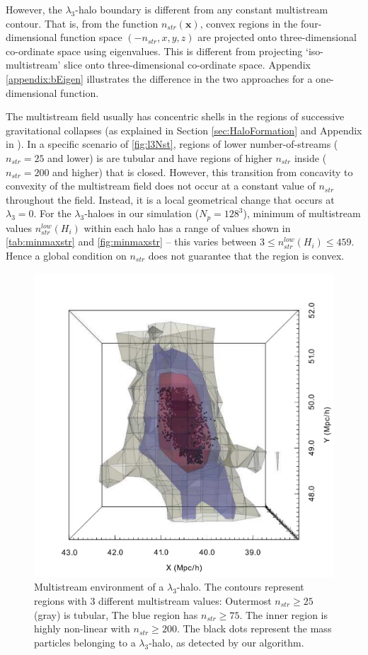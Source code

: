 However, the $\lambda_3$-halo boundary is different from any constant multistream contour. That is, from the function $n_{str}(\mathbf{x})$, convex regions in the four-dimensional function space $(-n_{str}, x, y, z)$ are projected onto three-dimensional co-ordinate space using eigenvalues. This is different from projecting `iso-multistream' slice onto three-dimensional co-ordinate space. Appendix \ref{appendix:bEigen} illustrates the difference in the two approaches for a one-dimensional function. 


The multistream field usually has concentric shells in the regions of successive gravitational collapses (as explained in Section \ref{sec:HaloFormation} and Appendix in \citealt{Ramachandra2017}). In a specific scenario  of \autoref{fig:l3Nst}, regions of lower number-of-streams ($n_{str} = 25$ and lower) is are tubular and have regions of higher $n_{str}$ inside ($n_{str} = 200$ and higher) that is closed. However, this transition from concavity to convexity of the multistream field does not occur at a constant value of $n_{str}$ throughout the field. Instead, it is a local geometrical change that occurs at $\lambda_3 = 0$. For the $\lambda_3$-haloes in our simulation ($N_p = 128^3$), minimum of multistream values $n_{str}^{low}(H_i)$ within each halo has a range of values shown in \autoref{tab:minmaxstr} and \autoref{fig:minmaxstr} -- this varies between $ 3 \leq n_{str}^{low}(H_i) \leq 459$. Hence a global condition on $n_{str}$ does not guarantee that the region is convex. 



\begin{figure}
\begin{minipage}[t]{.99\linewidth}
  \centering\includegraphics[width=8.cm]{Chapter5/Source_v2/fig9.pdf} 
\end{minipage}\hfill
\caption{Multistream environment of a $\lambda_3$-halo. The contours represent regions with 3 different multistream values: Outermost $n_{str} \geq 25$ (gray) is tubular, The blue region has $n_{str} \geq 75$. The inner region is highly non-linear with $n_{str} \geq 200$.  The black dots represent the mass particles belonging to a $\lambda_3$-halo, as detected by our algorithm.}
\label{fig:l3Nst}
\end{figure}



